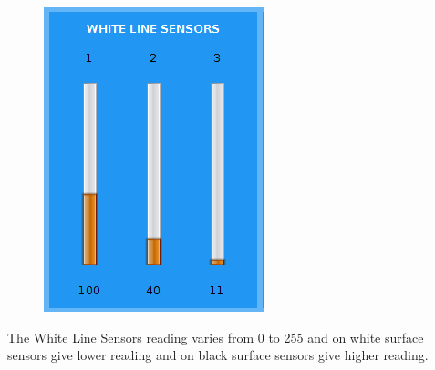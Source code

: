 \documentclass[a4paper,12pt,oneside]{book}
\begin{document}
\begin{enumerate}
\begin{itemize}
\begin{itemize}
				\begin{figure}[h]
					\begin{center}
						\includegraphics[scale=1]{whitelinesensor.png}
					\end{center}
				\end{figure}
				The White Line Sensors reading varies from 0 to 255 and on white surface sensors give lower reading and on black surface sensors give higher reading.
				

\end{itemize}
\end{itemize}
\end{enumerate}
\end{document}
